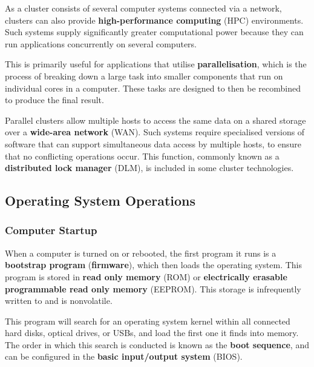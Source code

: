 \documentclass{article}
\begin{document}
\begin{tcolorboxlarge}[title={High-Performance Computing}, parbox=false]
    As a cluster consists of several computer systems connected via a
    network, clusters can also provide \textbf{high-performance
        computing} (HPC) environments. Such systems supply significantly
    greater computational power because they can run applications
    concurrently on several computers.

    This is primarily useful for applications that utilise
    \textbf{parallelisation}, which is the process of breaking down a
    large task into smaller components that run on individual cores in
    a computer. These tasks are designed to then be recombined to
    produce the final result.
\end{tcolorboxlarge}

\begin{tcolorboxlarge}[title={Parallel Clustering}, parbox=false]
    Parallel clusters allow multiple hosts to access the same data on a
    shared storage over a \textbf{wide-area network} (WAN).
    Such systems require specialised versions of software that can
    support simultaneous data access by multiple hosts, to ensure that
    no conflicting operations occur.
    This function, commonly known as a \textbf{distributed lock
        manager} (DLM), is included in some cluster technologies.
\end{tcolorboxlarge}
\subsection{Operating System Operations}
\subsubsection{Computer Startup}
When a computer is turned on or rebooted, the first program it runs is
a \textbf{bootstrap program} (\textbf{firmware}), which then loads the
operating system. This program is stored in \textbf{read only memory}
(ROM) or \textbf{electrically erasable programmable read only memory}
(EEPROM). This storage is infrequently written to and is nonvolatile.

This program will search for an operating system kernel within all
connected hard disks, optical drives, or USBs, and load the first one
it finds into memory. The order in which this search is conducted is
known as the \textbf{boot sequence}, and can be configured in the
\textbf{basic input/output system} (BIOS).
\end{document}
